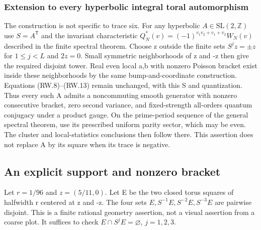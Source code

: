 \subsubsection{Extension to every hyperbolic integral toral automorphism}\label{return_words:extension-to-every-hyperbolic-integral-toral-automorphism}

The construction is not specific to trace six. For any hyperbolic \(A\in\mathrm{SL}(2,\mathbb Z)\) use \(S=A^{\mathsf T}\) and the invariant characteristic \(Q_N^*(v)=(-1)^{v_1v_2+v_1+v_2}W_N(v)\) described in the finite spectral theorem. Choose z outside the finite sets \(S^jz=\pm z\) for \(1\leq j<L\) and \(2z=0\). Small symmetric neighborhoods of z and -z then give the required disjoint tower. Real even local a,b with nonzero Poisson bracket exist inside these neighborhoods by the same bump-and-coordinate construction. Equations (RW.8)--(RW.13) remain unchanged, with this S and quantization. Thus every such A admits a noncommuting smooth generator with nonzero consecutive bracket, zero second variance, and fixed-strength all-orders quantum conjugacy under a product gauge. On the prime-period sequence of the general spectral theorem, use its prescribed uniform parity sector, which may be even. The cluster and local-statistics conclusions then follow there. This assertion does not replace A by its square when its trace is negative.

\subsection{An explicit support and nonzero bracket}\label{return_words:an-explicit-support-and-nonzero-bracket}

Let \(r=1/96\) and \(z=(5/11,0)\). Let E be the two closed torus squares of halfwidth r centered at z and -z. The four sets \(E,S^{-1}E,S^{-2}E,S^{-3}E\) are pairwise disjoint. This is a finite rational geometry assertion, not a visual assertion from a coarse plot. It suffices to check \(E\cap S^jE=\varnothing\), \(j=1,2,3\).

